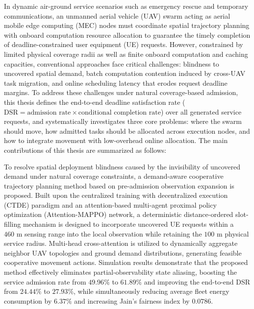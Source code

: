 \begin{abstract*}
In dynamic air-ground service scenarios such as emergency rescue and temporary communications, an unmanned aerial vehicle (UAV) swarm acting as aerial mobile edge computing (MEC) nodes must coordinate spatial trajectory planning with onboard computation resource allocation to guarantee the timely completion of deadline-constrained user equipment (UE) requests. However, constrained by limited physical coverage radii as well as finite onboard computation and caching capacities, conventional approaches face critical challenges: blindness to uncovered spatial demand, batch computation contention induced by cross-UAV task migration, and online scheduling latency that erodes request deadline margins. To address these challenges under natural coverage-based admission, this thesis defines the end-to-end deadline satisfaction rate ($\text{DSR} = \text{admission rate} \times \text{conditional completion rate}$) over all generated service requests, and systematically investigates three core problems: where the swarm should move, how admitted tasks should be allocated across execution nodes, and how to integrate movement with low-overhead online allocation. The main contributions of this thesis are summarized as follows:  

To resolve spatial deployment blindness caused by the invisibility of uncovered demand under natural coverage constraints, a demand-aware cooperative trajectory planning method based on pre-admission observation expansion is proposed. Built upon the centralized training with decentralized execution (CTDE) paradigm and an attention-based multi-agent proximal policy optimization (Attention-MAPPO) network, a deterministic distance-ordered slot-filling mechanism is designed to incorporate uncovered UE requests within a $460\text{ m}$ sensing range into the local observation while retaining the $100\text{ m}$ physical service radius. Multi-head cross-attention is utilized to dynamically aggregate neighbor UAV topologies and ground demand distributions, generating feasible cooperative movement actions. Simulation results demonstrate that the proposed method effectively eliminates partial-observability state aliasing, boosting the service admission rate from $49.96\%$ to $61.89\%$ and improving the end-to-end DSR from $24.44\%$ to $27.93\%$, while simultaneously reducing average fleet energy consumption by $6.37\%$ and increasing Jain's fairness index by $0.0786$.  


\end{abstract*}
